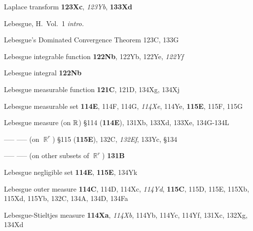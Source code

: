 



\indexmedskip





Laplace transform {\bf 123Xc}, {\it 123Yb}, {\bf 133Xd}






















Lebesgue, H.\   Vol.\ 1 {\it intro.}











Lebesgue's Dominated Convergence Theorem 123C, 133G



Lebesgue integrable function {\bf 122Nb}, 122Yb, 122Ye, {\it
122Yf}

Lebesgue integral {\bf 122Nb}

Lebesgue measurable function {\bf 121C}, 121D, 134Xg, 134Xj

Lebesgue measurable set {\bf 114E}, 114F, 114G, {\it 114Xe}, 114Ye, {\bf
115E}, 115F, 115G

Lebesgue measure (on $\Bbb R$) \S114 ({\bf 114E}), 131Xb, 133Xd, 133Xe,
134G-134L


----- ----- (on $\BbbR^r$) \S115 ({\bf 115E}), 132C, {\it 132Ef}, 133Yc,
\S134




----- ----- (on other subsets of $\BbbR^r$) {\bf 131B}





Lebesgue negligible set {\bf 114E}, {\bf 115E}, 134Yk



Lebesgue outer measure {\bf 114C}, 114D, 114Xc, {\it 114Yd}, {\bf
115C}, 115D, 115E, 115Xb, 115Xd, 115Yb, 132C, 134A, 134D, 134Fa



Lebesgue-Stieltjes measure {\bf 114Xa}, {\it 114Xb}, 114Yb, 114Yc, 114Yf, 131Xc,
132Xg, 134Xd



